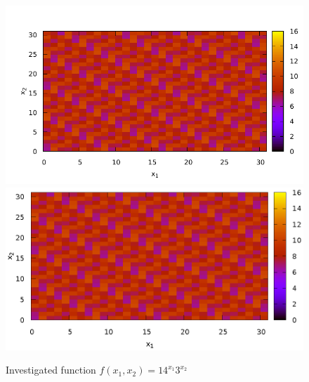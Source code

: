 \begin{figure}
\centering

\ifpdf
\includegraphics[angle=0]
{./part4/quantcomp/picdiscretlog0.pdf}
\else
\includegraphics[angle=0]
{./part4/quantcomp/picdiscretlog0.eps}
\fi
%

\caption{Investigated function $f(x_1, x_2) = 14^{x_1}3^{x_2}$} 
\label{fig:part4:quantcomp:dl0}
\end{figure}